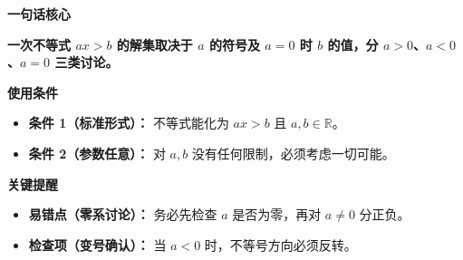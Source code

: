 \begin{summarybox}

	\textbf{\textcolor{CSummary}{一句话核心}}

	\textbf{一次不等式 $ax>b$ 的解集取决于 $a$ 的符号及 $a=0$ 时 $b$ 的值，分 $a>0$、$a<0$、$a=0$ 三类讨论。}

	\medskip
	\textbf{\textcolor{CSummary}{使用条件}}
	\begin{itemize}[leftmargin=*, itemsep=0.5em, topsep=0.4em]
		\item \textbf{条件 1（标准形式）：} 不等式能化为 $ax>b$ 且 $a,b\in\mathbb{R}$。
		\item \textbf{条件 2（参数任意）：} 对 $a,b$ 没有任何限制，必须考虑一切可能。
	\end{itemize}

	\medskip
	\textbf{\textcolor{CSummary}{关键提醒}}
	\begin{itemize}[leftmargin=*, itemsep=0.5em, topsep=0.4em]
		\item \textbf{易错点（零系讨论）：} 务必先检查 $a$ 是否为零，再对 $a\neq0$ 分正负。
		\item \textbf{检查项（变号确认）：} 当 $a<0$ 时，不等号方向必须反转。
	\end{itemize}

\end{summarybox}
